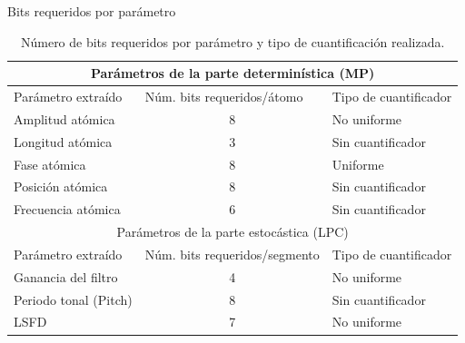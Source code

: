\documentclass[xcolor=table]{beamer}
\begin{document}
\begin{frame}{Bits requeridos por par\'ametro}
	\begin{table}\scriptsize
		\centering
		\begin{tabular}{@{}lcl@{}}
		\toprule
		\multicolumn{3}{c}{Par\'ametros de la parte determin\'istica (MP)}                           \\ \midrule
	Par\'ametro extra\'ido    & \multicolumn{1}{l}{N\'um. bits requeridos/\'atomo} & Tipo de cuantificador \\ \midrule
		Amplitud at\'omica      & 8                                        & No uniforme           \\ \midrule
		Longitud at\'omica      & 3                                        & Sin cuantificador     \\ \midrule
		Fase at\'omica          & 8                                        & Uniforme              \\ \midrule
		Posici\'on at\'omica      & 8                                        & Sin cuantificador     \\ \midrule
		Frecuencia at\'omica    & 6                                        & Sin cuantificador     \\ \midrule
		\multicolumn{3}{c}{Par\'ametros de la parte estoc\'astica (LPC)}                            \\ \midrule
		Par\'ametro extra\'ido    & \multicolumn{1}{l}{N\'um. bits requeridos/segmento} & Tipo de cuantificador \\ \midrule
		Ganancia del filtro   & 4                                        & No uniforme           \\ \midrule
		Periodo tonal (Pitch) & 8                                        & Sin cuantificador     \\ \midrule
		LSFD                  & 7                                        & No uniforme          
		\end{tabular}
		\caption{N\'umero de bits requeridos por par\'ametro y tipo de cuantificaci\'on realizada.}
	\end{table}
\end{frame}
\end{document}
